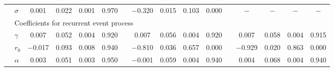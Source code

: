\documentclass[10pt]{beamer}
\begin{document}
\begin{frame}[allowframebreaks]
\begin{table}[H]
{\begin{tabular}{clcccccccccccccc}
&  $\sigma$ & 0.001 & 0.022 & 0.001 & 0.970 & & $-$0.320 & 0.015 & 0.103 & 0.000 && $-$ & $-$ & $-$ & $-$ \\
&  \multicolumn{12}{l}{Coefficients for recurrent event process}\\
&  $\gamma$ & 0.007 & 0.052 & 0.004 & 0.920 & & 0.007 & 0.056 & 0.004 & 0.920 && 0.007 & 0.058 & 0.004 & 0.915\\
&  $r_0$ & $-$0.017 & 0.093 & 0.008 & 0.940 && $-$0.810 & 0.036 & 0.657 & 0.000 && $-$0.929 & 0.020 & 0.863 & 0.000\\
&  $\alpha$ & 0.003 & 0.051& 0.003 & 0.950 & & $-$0.001 & 0.059 & 0.004 & 0.940 && 0.004 & 0.068 & 0.004 & 0.940\\
   \hline
\end{tabular}
}
\end{table}




\end{frame}
\end{document}
